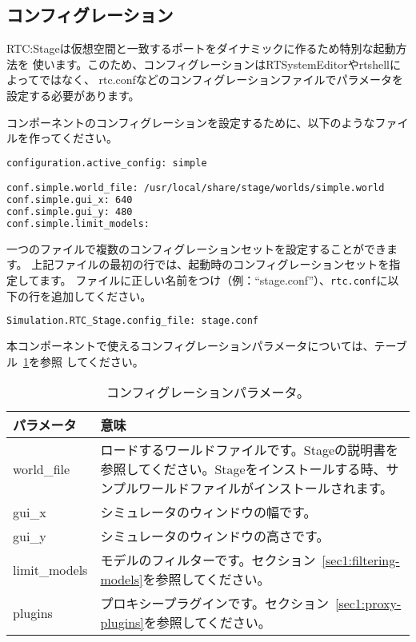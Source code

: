 \documentclass[a4paper,10pt]{article}
\newenvironment{Japanese}{%
  \CJKfamily{min}%
  \CJKtilde
  \CJKnospace}{}
\begin{document}
\begin{CJK}{UTF8}{}
\begin{Japanese}
\section{コンフィグレーション}
\label{sec:configuration}

RTC:Stageは仮想空間と一致するポートをダイナミックに作るため特別な起動方法を
使います。このため、コンフィグレーションはRTSystemEditorやrtshellによってではなく、
rtc.confなどのコンフィグレーションファイルでパラメータを設定する必要があります。

コンポーネントのコンフィグレーションを設定するために、以下のようなファイルを作ってください。

\begin{lstlisting}[frame=tb, language=bash]
configuration.active_config: simple

conf.simple.world_file: /usr/local/share/stage/worlds/simple.world
conf.simple.gui_x: 640
conf.simple.gui_y: 480
conf.simple.limit_models:
\end{lstlisting}

一つのファイルで複数のコンフィグレーションセットを設定することができます。
上記ファイルの最初の行では、起動時のコンフィグレーションセットを指定してます。
ファイルに正しい名前をつけ（例：``stage.conf''）、\verb|rtc.conf|に以下の行を追加してください。

\begin{lstlisting}[frame=tb, language=bash]
Simulation.RTC_Stage.config_file: stage.conf
\end{lstlisting}

本コンポーネントで使えるコンフィグレーションパラメータについては、テーブル~\ref{tab:config_params}を参照
してください。

\begin{table}[t]
  \centering
  \begin{tabularx}{\columnwidth}{lX}
    \toprule
    パラメータ & 意味 \\
    \midrule
    world\_file & ロードするワールドファイルです。Stageの説明書を参照してください。Stageをインストールする時、サンプルワールドファイルがインストールされます。 \\
    gui\_x & シミュレータのウィンドウの幅です。 \\
    gui\_y & シミュレータのウィンドウの高さです。 \\
    limit\_models & モデルのフィルターです。セクション~\ref{sec1:filtering-models}を参照してください。 \\
    plugins & プロキシープラグインです。セクション~\ref{sec1:proxy-plugins}を参照してください。 \\
    \bottomrule
  \end{tabularx}
  \caption{コンフィグレーションパラメータ。}
  \label{tab:config_params}
\end{table}


\end{Japanese}
\end{CJK}
\end{document}
